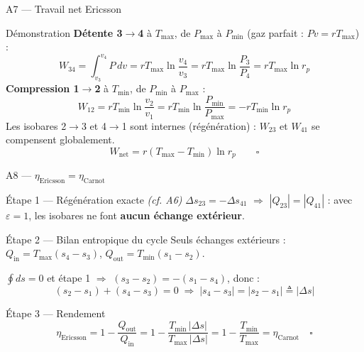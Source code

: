 \documentclass[aspectratio=43, 10pt]{beamer}
\newcommand{\Tmin}{T_{\min}}
\newcommand{\Tmax}{T_{\max}}
\newcommand{\Pmin}{P_{\min}}
\newcommand{\Pmax}{P_{\max}}
\newcommand{\rp}{r_p}
\newcommand{\etaC}{\eta_{\text{Carnot}}}
\newcommand{\Wnet}{W_{\text{net}}}
\newcommand{\Qin}{Q_{\text{in}}}
\newcommand{\Qout}{Q_{\text{out}}}
\begin{document}
\begin{frame}{A7 --- Travail net Ericsson}

  \begin{block}{D\'emonstration}
    \textbf{D\'etente 3$\to$4} \`a $\Tmax$, de $\Pmax$ \`a $\Pmin$
    (gaz parfait : $Pv = r\Tmax$) :
    \[
      W_{34} = \int_{v_3}^{v_4} P\,dv
             = r\Tmax\ln\!\frac{v_4}{v_3}
             = r\Tmax\ln\!\frac{P_3}{P_4}
             = r\Tmax\ln\rp
    \]
    \textbf{Compression 1$\to$2} \`a $\Tmin$, de $\Pmin$ \`a $\Pmax$ :
    \[
      W_{12} = r\Tmin\ln\!\frac{v_2}{v_1}
             = r\Tmin\ln\!\frac{\Pmin}{\Pmax}
             = -r\Tmin\ln\rp
    \]
    Les isobares 2$\to$3 et 4$\to$1 sont internes (r\'eg\'en\'eration) :
    $W_{23}$ et $W_{41}$ se compensent globalement.
    \[
      \boxed{\Wnet = r(\Tmax-\Tmin)\ln\rp}
      \qquad\square
    \]
  \end{block}

\end{frame}

\begin{frame}{A8 --- $\eta_{\text{Ericsson}} = \etaC$}

  \begin{block}{\'Etape 1 --- R\'eg\'en\'eration exacte \textit{(cf. A6)}}
    \small
    $\Delta s_{23} = -\Delta s_{41}$
    $\Rightarrow$ $|Q_{23}| = |Q_{41}|$ :
    avec $\varepsilon = 1$, les isobares ne font
    \textbf{aucun \'echange ext\'erieur}.
  \end{block}

  \begin{block}{\'Etape 2 --- Bilan entropique du cycle}
    \small
    Seuls \'echanges ext\'erieurs :
    $\Qin = \Tmax(s_4-s_3)$, $\Qout = \Tmin(s_1-s_2)$.

    $\oint ds = 0$ et \'etape 1 $\Rightarrow$
    $(s_3-s_2) = -(s_1-s_4)$, donc :
    \[
      (s_2-s_1) + (s_4-s_3) = 0
      \;\Rightarrow\;
      |s_4-s_3| = |s_2-s_1| \triangleq |\Delta s|
    \]
  \end{block}

  \begin{block}{\'Etape 3 --- Rendement}
    \[
      \boxed{\eta_{\text{Ericsson}}
             = 1 - \frac{\Qout}{\Qin}
             = 1 - \frac{\Tmin\,|\Delta s|}{\Tmax\,|\Delta s|}
             = 1 - \frac{\Tmin}{\Tmax}
             = \etaC}
      \quad\square
    \]
  \end{block}

\end{frame}
\end{document}
